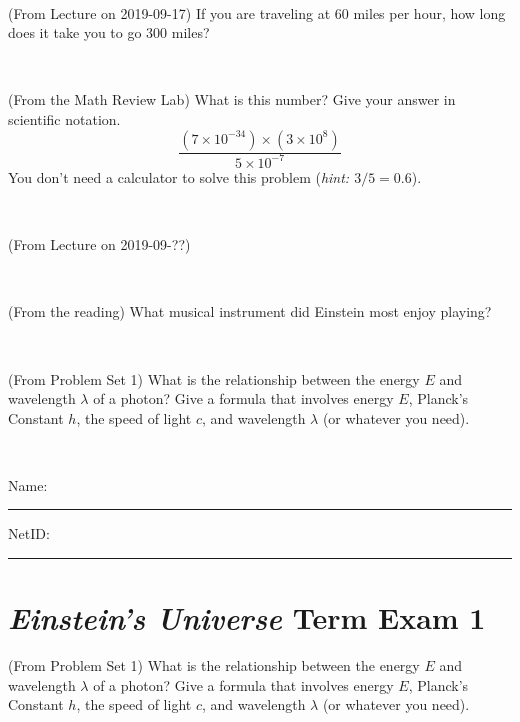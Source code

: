 \documentclass[12pt, letterpaper]{article}
\begin{document}
\vfill ~

\begin{problem} (From Lecture on 2019-09-17)
If you are traveling at 60 miles per hour, how long does
it take you to go 300 miles?
\end{problem}


\vfill ~


\clearpage


\begin{problem} (From the Math Review Lab)
What is this number? Give your answer in scientific notation.
$$
\frac{(7\times10^{-34})\times(3\times10^8)}{5\times10^{-7}}
$$
You don't need a calculator to solve this problem (\textit{hint: $3/5=0.6$}).
\end{problem}


\vfill ~

\begin{problem} (From Lecture on 2019-09-??)
\end{problem}


\vfill ~

\begin{problem} (From the reading)
What musical instrument did Einstein most enjoy playing?
\end{problem}


\vfill ~

\begin{problem} (From Problem Set 1)
What is the relationship between the energy $E$ and wavelength
$\lambda$ of a photon? Give a formula that involves energy $E$,
Planck's Constant $h$, the speed of light $c$, and wavelength
$\lambda$ (or whatever you need).
\end{problem}

\vfill ~


\cleardoublepage



\noindent
Name: \rule[-1ex]{0.60\textwidth}{0.1pt}
NetID: \rule[-1ex]{0.20\textwidth}{0.1pt}

\section*{\textsl{Einstein's Universe} Term Exam 1}
\setcounter{problem}{1}


\begin{problem} (From Problem Set 1)
What is the relationship between the energy $E$ and wavelength
$\lambda$ of a photon? Give a formula that involves energy $E$,
Planck's Constant $h$, the speed of light $c$, and wavelength
$\lambda$ (or whatever you need).
\end{problem}
\end{document}
